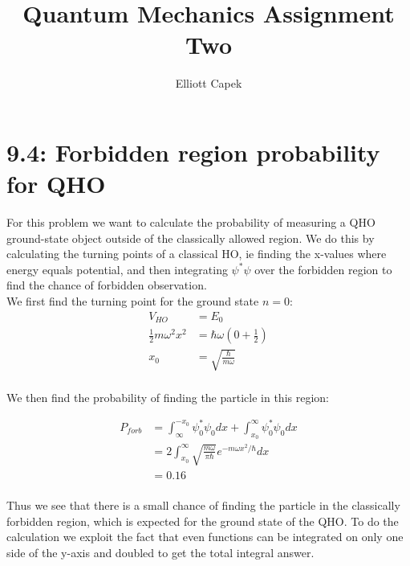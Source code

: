 \documentclass[10pt]{article} %
\title{Quantum Mechanics Assignment Two}
\author{Elliott Capek}
\begin{document}
\maketitle{}

\section{9.4: Forbidden region probability for QHO}
For this problem we want to calculate the probability of measuring a QHO ground-state object outside
of the classically allowed region. We do this by calculating the turning points of a classical HO,
ie finding the x-values where energy equals potential, and then integrating $\psi^*\psi$ over the
forbidden region to find the chance of forbidden observation.\\

We first find the turning point for the ground state $n=0$:
\begin{align*}
  V_{HO} &= E_0\\
  \frac{1}{2}m\omega^2x^2 &= \hbar\omega\left(0+\frac{1}{2}\right)\\
  x_0 &= \sqrt{\frac{\hbar}{m\omega}}\\
\end{align*}

We then find the probability of finding the particle in this region:

\begin{align*}
  P_{forb} &= \int_{\infty}^{-x_0} \psi_0^*\psi_0 dx + \int_{x_0}^{\infty} \psi_0^*\psi_0 dx\\
  &= 2\int_{x_0}^{\infty} \sqrt{\frac{m\omega}{\pi\hbar}}e^{-m\omega x^2 / \hbar} dx\\
  &= 0.16\\
\end{align*}

Thus we see that there is a small chance of finding the particle in the classically
forbidden region, which is expected for the ground state of the QHO. To do the
calculation we exploit the fact that even functions can be integrated on only one
side of the y-axis and doubled to get the total integral answer.\\

\end{document}
